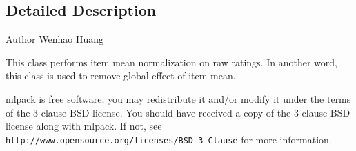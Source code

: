 \subsection{Detailed Description}
\begin{DoxyAuthor}{Author}
Wenhao Huang
\end{DoxyAuthor}
This class performs item mean normalization on raw ratings. In another word, this class is used to remove global effect of item mean.

mlpack is free software; you may redistribute it and/or modify it under the terms of the 3-\/clause B\+SD license. You should have received a copy of the 3-\/clause B\+SD license along with mlpack. If not, see {\tt http\+://www.\+opensource.\+org/licenses/\+B\+S\+D-\/3-\/\+Clause} for more information. 